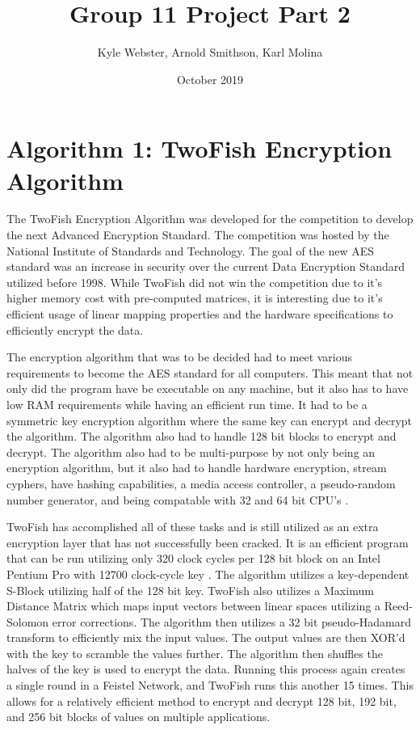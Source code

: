 \documentclass{article}
\title{Group 11 Project Part 2}
\author{Kyle Webster, Arnold Smithson, Karl Molina }
\date{October 2019}
\begin{document}
\maketitle

\section{Algorithm 1: TwoFish Encryption Algorithm}
The TwoFish Encryption Algorithm was developed for the competition to develop the next Advanced Encryption Standard. The competition was hosted by the National Institute of Standards and Technology. The goal of the new AES standard was an increase in security over the current Data Encryption Standard  utilized before 1998. While TwoFish did not win the competition due to it's higher memory cost with pre-computed matrices, it is interesting due to it's efficient usage of linear mapping properties and the hardware specifications to efficiently encrypt the data.

The encryption algorithm that was to be decided had to meet various requirements to become the AES standard for all computers. This meant that not only did the program have be executable on any machine, but it also has to have low RAM requirements while having an efficient run time. It had to be a symmetric key encryption algorithm where the same key can encrypt and decrypt the algorithm. The algorithm also had to handle 128 bit blocks to encrypt and decrypt. The algorithm also had to be multi-purpose by not only being an encryption algorithm, but it also had to handle hardware encryption, stream cyphers, have hashing capabilities, a media access controller, a pseudo-random number generator, and being compatable with 32 and 64 bit CPU's \cite{TwoFish}.

TwoFish has accomplished all of these tasks and is still utilized as an extra encryption layer that has not successfully been cracked. It is an efficient program that can be run utilizing only 320 clock cycles per 128 bit block on an Intel Pentium Pro with 12700 clock-cycle key \cite{TwoFish}. The algorithm utilizes a key-dependent S-Block utilizing half of the 128 bit key. TwoFish also utilizes a Maximum Distance Matrix which maps input vectors between linear spaces utilizing a Reed-Solomon error corrections. The algorithm then utilizes a 32 bit pseudo-Hadamard transform to efficiently mix the input values. The output values are then XOR'd with the key to scramble the values further. The algorithm then shuffles the halves of the key is used to encrypt the data. Running this process again creates a single round in a Feistel Network, and TwoFish runs this another 15 times. This allows for a relatively efficient method to encrypt and decrypt 128 bit, 192 bit, and 256 bit blocks of values on multiple applications. \cite{TwoFish} 
\end{document}

